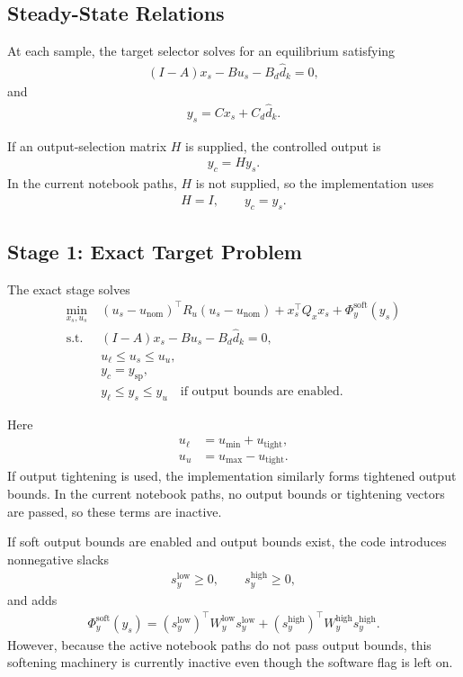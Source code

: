\documentclass[11pt]{article}
\begin{document}
\subsection{Steady-State Relations}
At each sample, the target selector solves for an equilibrium satisfying
\begin{align}
(I-A)x_s - Bu_s - B_d \hat d_k = 0, \label{eq:ssdyn}
\end{align}
and
\begin{align}
y_s = Cx_s + C_d \hat d_k. \label{eq:ssout}
\end{align}

If an output-selection matrix $H$ is supplied, the controlled output is
\begin{align}
y_c = H y_s.
\end{align}
In the current notebook paths, $H$ is not supplied, so the implementation uses
\begin{align}
H = I, \qquad y_c = y_s.
\end{align}

\subsection{Stage 1: Exact Target Problem}
The exact stage solves
\begin{align}
\min_{x_s,u_s}
\;&
(u_s-u_{\mathrm{nom}})^\top R_u (u_s-u_{\mathrm{nom}})
+
x_s^\top Q_x x_s
+
\Phi_y^{\mathrm{soft}}(y_s) \\
\text{s.t. }\;&
(I-A)x_s - Bu_s - B_d\hat d_k = 0, \\
& u_{\ell} \le u_s \le u_u, \\
& y_c = y_{\mathrm{sp}}, \\
& y_{\ell} \le y_s \le y_u
\quad \text{if output bounds are enabled.}
\end{align}

Here
\begin{align}
u_{\ell} &= u_{\min} + u_{\mathrm{tight}}, \\
u_u &= u_{\max} - u_{\mathrm{tight}}.
\end{align}
If output tightening is used, the implementation similarly forms tightened output bounds. In the current notebook paths, no output bounds or tightening vectors are passed, so these terms are inactive.

If soft output bounds are enabled and output bounds exist, the code introduces nonnegative slacks
\begin{align}
s_y^{\mathrm{low}} \ge 0,
\qquad
s_y^{\mathrm{high}} \ge 0,
\end{align}
and adds
\begin{align}
\Phi_y^{\mathrm{soft}}(y_s)
=
(s_y^{\mathrm{low}})^\top W_y^{\mathrm{low}} s_y^{\mathrm{low}}
+
(s_y^{\mathrm{high}})^\top W_y^{\mathrm{high}} s_y^{\mathrm{high}}.
\end{align}
However, because the active notebook paths do not pass output bounds, this softening machinery is currently inactive even though the software flag is left on.
\end{document}
